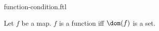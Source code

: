 \documentclass{stex}
\begin{document}
\begin{smodule}{function-condition.ftl}


\begin{fakeforthel}
  \begin{axiom}
    Let $f$ be a map.
    $f$ is a function iff $\dom(f)$ is a set.
  \end{axiom}
\end{fakeforthel}

\end{smodule}
\end{document}
